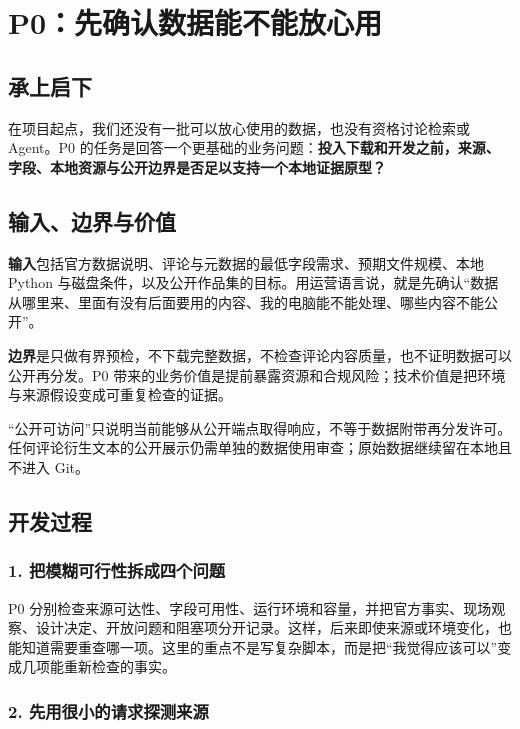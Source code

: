 \chapter{P0：先确认数据能不能放心用}

\section{承上启下}

在项目起点，我们还没有一批可以放心使用的数据，也没有资格讨论检索或 Agent。P0 的任务是回答一个更基础的业务问题：\textbf{投入下载和开发之前，来源、字段、本地资源与公开边界是否足以支持一个本地证据原型？}

\section{输入、边界与价值}

\textbf{输入}包括官方数据说明、评论与元数据的最低字段需求、预期文件规模、本地 Python 与磁盘条件，以及公开作品集的目标。用运营语言说，就是先确认“数据从哪里来、里面有没有后面要用的内容、我的电脑能不能处理、哪些内容不能公开”。

\textbf{边界}是只做有界预检，不下载完整数据，不检查评论内容质量，也不证明数据可以公开再分发。P0 带来的业务价值是提前暴露资源和合规风险；技术价值是把环境与来源假设变成可重复检查的证据。

\begin{boundarybox}
“公开可访问”只说明当前能够从公开端点取得响应，不等于数据附带再分发许可。任何评论衍生文本的公开展示仍需单独的数据使用审查；原始数据继续留在本地且不进入 Git。
\end{boundarybox}

\section{开发过程}

\subsection{1. 把模糊可行性拆成四个问题}

P0 分别检查来源可达性、字段可用性、运行环境和容量，并把官方事实、现场观察、设计决定、开放问题和阻塞项分开记录。这样，后来即使来源或环境变化，也能知道需要重查哪一项。这里的重点不是写复杂脚本，而是把“我觉得应该可以”变成几项能重新检查的事实。

\subsection{2. 先用很小的请求探测来源}

